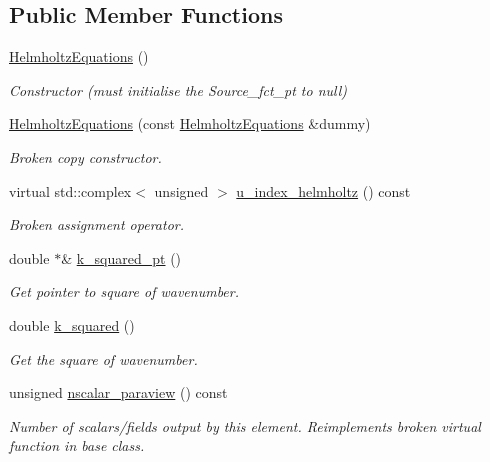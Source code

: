 \subsection*{Public Member Functions}
\begin{DoxyCompactItemize}
\item 
\hyperlink{classoomph_1_1HelmholtzEquations_a49deec1f79afba8b847da1abf50049a3}{Helmholtz\+Equations} ()
\begin{DoxyCompactList}\small\item\em Constructor (must initialise the Source\+\_\+fct\+\_\+pt to null) \end{DoxyCompactList}\item 
\hyperlink{classoomph_1_1HelmholtzEquations_a938188bb8d574804293e70aa62c1c8b7}{Helmholtz\+Equations} (const \hyperlink{classoomph_1_1HelmholtzEquations}{Helmholtz\+Equations} \&dummy)
\begin{DoxyCompactList}\small\item\em Broken copy constructor. \end{DoxyCompactList}\item 
virtual std\+::complex$<$ unsigned $>$ \hyperlink{classoomph_1_1HelmholtzEquations_a2c2e01a3fb0a4c30ec99aad2d080abaf}{u\+\_\+index\+\_\+helmholtz} () const
\begin{DoxyCompactList}\small\item\em Broken assignment operator. \end{DoxyCompactList}\item 
double $\ast$\& \hyperlink{classoomph_1_1HelmholtzEquations_af5812d14d424a8f6cff5884863576cb3}{k\+\_\+squared\+\_\+pt} ()
\begin{DoxyCompactList}\small\item\em Get pointer to square of wavenumber. \end{DoxyCompactList}\item 
double \hyperlink{classoomph_1_1HelmholtzEquations_ac502eaf1215845644e6101825397601c}{k\+\_\+squared} ()
\begin{DoxyCompactList}\small\item\em Get the square of wavenumber. \end{DoxyCompactList}\item 
unsigned \hyperlink{classoomph_1_1HelmholtzEquations_a339ef87468c1f5094b9f56e99c3bb212}{nscalar\+\_\+paraview} () const
\begin{DoxyCompactList}\small\item\em Number of scalars/fields output by this element. Reimplements broken virtual function in base class. \end{DoxyCompactList}\item 

\end{DoxyCompactItemize}
